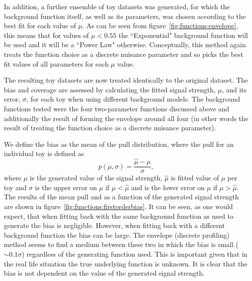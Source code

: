 In addition, a further ensemble of toy datasets was generated, for which the background function itself, as well 
as its parameters, was chosen according to the best fit for each value of $\mu$. As can be seen from 
figure~\ref{fig:functions:envelope}, this means that for values of $\mu < 0.55$ the ``Exponential" background 
function will be used and it will be a ``Power Law" otherwise. Conceptually, this method again
treats the function choice as a discrete nuisance parameter and so picks the
best fit values of all parameters for each $\mu$ value.

The resulting toy datasets are now treated identically to the original dataset. The bias and coverage are assessed by calculating the fitted signal strength, $\mu$, and its error, $\sigma$, for each toy when using different background models. The background functions tested were the four two-parameter functions discussed above and additionally the result of forming the envelope around all four (in other words the result of treating the function choice as a discrete nuisance parameter). 

We define the bias as the mean of the pull distribution, where the pull for an individual toy is defined as
\begin{equation}
	p(\mu,\sigma) = \frac{\hat{\mu}-\mu}{\sigma},
\end{equation}
where $\mu$ is the generated value of the signal strength, $\hat{\mu}$ is fitted value of $\mu$ per toy and $\sigma$ is the upper error on $\mu$ if $\mu<\hat{\mu}$ and is the lower error on $\mu$ if $\mu>\hat{\mu}$. The results of the mean pull and as a function of the generated signal strength are shown in figure~\ref{fig:functions:firstorderbias}. It can be seen, as one would expect, that when fitting back with the same background function as used to generate the bias is negligible. However, when fitting back with a different background function the bias can be large. The envelope (discrete profiling) method seems to find a medium between these two in which the bias is small ($\sim 0.1\sigma$) regardless of the generating function used. This is important given that in the real life situation the true underlying function is unknown. It is clear that the bias is not dependent on the value of the generated signal strength.


